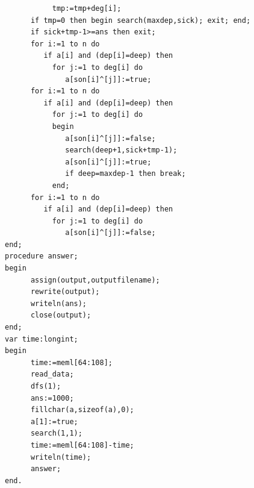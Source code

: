 \documentclass[11pt]{article}
\begin{document}
\begin{verbatim}
           tmp:=tmp+deg[i];
      if tmp=0 then begin search(maxdep,sick); exit; end;
      if sick+tmp-1>=ans then exit;
      for i:=1 to n do
         if a[i] and (dep[i]=deep) then
           for j:=1 to deg[i] do
              a[son[i]^[j]]:=true;
      for i:=1 to n do
         if a[i] and (dep[i]=deep) then
           for j:=1 to deg[i] do
           begin
              a[son[i]^[j]]:=false;
              search(deep+1,sick+tmp-1);
              a[son[i]^[j]]:=true;
              if deep=maxdep-1 then break;
           end;
      for i:=1 to n do
         if a[i] and (dep[i]=deep) then
           for j:=1 to deg[i] do
              a[son[i]^[j]]:=false;
end;
procedure answer;
begin
      assign(output,outputfilename);
      rewrite(output);
      writeln(ans);
      close(output);
end;
var time:longint;
begin
      time:=meml[64:108];
      read_data;
      dfs(1);
      ans:=1000;
      fillchar(a,sizeof(a),0);
      a[1]:=true;
      search(1,1);
      time:=meml[64:108]-time;
      writeln(time);
      answer;
end.
\end{verbatim}
\end{document}
